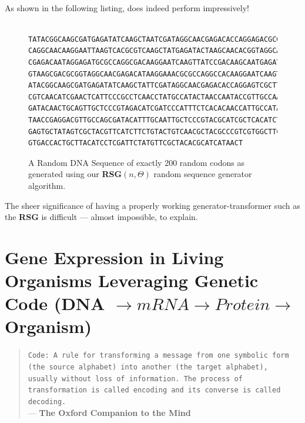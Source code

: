 \documentclass[a4paper, 18pt]{book} %
\begin{document}
\\

As shown in the following listing, does indeed perform impressively!

\begin{figure}[H]
  \begin{center}
  \begin{lstlisting}[caption={A RANDOM DNA SEQUENCE}, label={LST_RANDSEQ}, frame=single, numbers=none, basicstyle=\ttfamily,  commentstyle=\color{blue}]

TATACGGCAAGCGATGAGATATCAAGCTAATCGATAGGCAACGAGACACCAGGAGACGCGT
CAGGCAACAAGGAATTAAGTCACGCGTCAAGCTATGAGATACTAAGCAACACGGTAGGCAA
CGAGACAATAGGAGATGCGCCAGGCGACAAGGAATCAAGTTATCCGACAAGCAATGAGATA
GTAAGCGACGCGGTAGGCAACGAGACATAAGGAAACGCGCCAGGCCACAAGGAATCAAGTT
ATACGGCAAGCGATGAGATATCAAGCTATTCGATAGGCAACGAGACACCAGGAGTCGCTTC
CGTCAACATCGAACTCATTCCCGCCTCAACCTATGCCATACTAACCAATACCGTTGCCAAC
GATACAACTGCAGTTGCTCCCGTAGACATCGATCCCATTTCTCACACAACCATTGCCATAG
TAACCGAGGACGTTGCCAGCGATACATTTGCAATTGCTCCCGTACGCATCGCTCACATCTT
GAGTGCTATAGTCGCTACGTTCATCTTCTGTACTGTCAACGCTACGCCCGTCGTGGCTTCT
GTGACCACTGCTTACATCCTCGATTCTATGTTCGCTACACGCATCATAACT

\end{lstlisting}
  \end{center}
  \caption{A Random DNA Sequence of exactly 200 random codons as generated using our \textbf{RSG}$(n,\Theta)$ random sequence generator algorithm.}
  \label{RandomDNASEQ}
\end{figure}

The sheer significance of having a properly working generator-transformer such as the \textbf{RSG} is difficult --- almost impossible, to explain. 



\chapter{Gene Expression in Living Organisms Leveraging Genetic Code (DNA $\rightarrow mRNA \rightarrow Protein \rightarrow$ Organism)}
\label{SEC05}


\begin{quotation}
\noindent \texttt{Code: A rule for transforming a message from one symbolic form (the source alphabet) into another (the target alphabet), usually without loss of information. The process of transformation is called encoding and its converse is called decoding.}\\
\hspace*{\fill} --- \textbf{The Oxford Companion to the Mind}\cite{gregory1987oxford}
\end{quotation}
\end{document}
